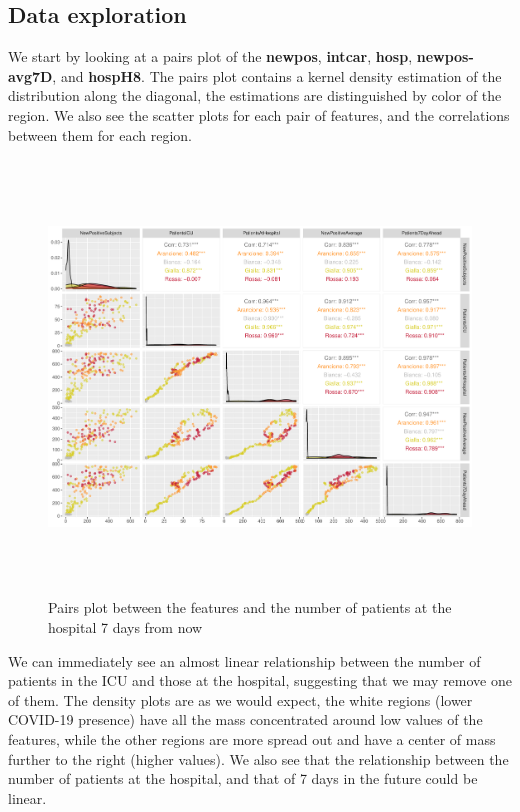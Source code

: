 \documentclass[12pt,a4paper]{article}
\theoremstyle{definition}
\theoremstyle{remark}
\begin{document}
	\subsection{Data exploration}
	We start by looking at a pairs plot of the \textbf{newpos}, \textbf{intcar}, \textbf{hosp}, \textbf{newpos-avg7D}, and \textbf{hospH8}. The pairs plot contains a kernel density estimation of the distribution along the diagonal, the estimations are distinguished by color of the region. We also see the scatter plots for each pair of features, and the correlations between them for each region.
	\begin{figure}[htb!]
		\centering
		\includegraphics[width=150mm, height=115mm,scale=0.5]{corrplot.pdf}
			\caption{Pairs plot between the features and the number of patients at the hospital 7 days from now}
	\end{figure}
	
	
	We can immediately see an almost linear relationship between the number of patients in the ICU and those at the hospital, suggesting that we may remove one of them. The density plots are as we would expect, the white regions (lower COVID-19 presence) have all the mass concentrated around low values of the features, while the other regions are more spread out and have a center of mass further to the right (higher values). We also see that the relationship between the number of patients at the hospital, and that of 7 days in the future could be linear.
	
\end{document}
